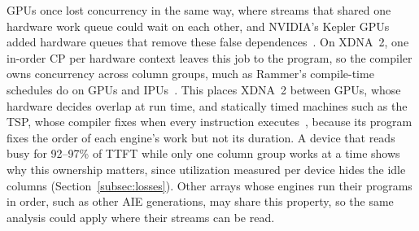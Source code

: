 
GPUs once lost concurrency in the same way, where streams that shared one hardware work queue could wait on each other, and NVIDIA's Kepler GPUs added hardware queues that remove these false dependences~\citep{nvidia-kepler-tuning}.
On XDNA~2, one in-order CP per hardware context leaves this job to the program, so the compiler owns concurrency across column groups, much as Rammer's compile-time schedules do on GPUs and IPUs~\citep{ma2020rammer}.
This places XDNA~2 between GPUs, whose hardware decides overlap at run time, and statically timed machines such as the TSP, whose compiler fixes when every instruction executes~\citep{abts2020tsp}, because its program fixes the order of each engine's work but not its duration.
A device that reads busy for 92--97\% of TTFT while only one column group works at a time shows why this ownership matters, since utilization measured per device hides the idle columns (Section~\ref{subsec:losses}).
Other arrays whose engines run their programs in order, such as other AIE generations, may share this property, so the same analysis could apply where their streams can be read.
